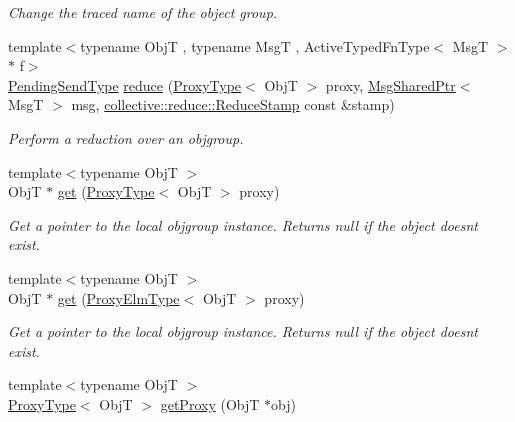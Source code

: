 \begin{DoxyCompactItemize}
\begin{DoxyCompactList}\small\item\em Change the traced name of the object group. \end{DoxyCompactList}\item 
{\footnotesize template$<$typename ObjT , typename MsgT , Active\+Typed\+Fn\+Type$<$ Msg\+T $>$ $\ast$ f$>$ }\\\hyperlink{structvt_1_1objgroup_1_1_obj_group_manager_a4f82f640edf670ba5a282074e5710921}{Pending\+Send\+Type} \hyperlink{structvt_1_1objgroup_1_1_obj_group_manager_a2aac72728c665b10dc7df994b3e326bc}{reduce} (\hyperlink{structvt_1_1objgroup_1_1_obj_group_manager_aea65eef52f240a52210132eef5ce591f}{Proxy\+Type}$<$ ObjT $>$ proxy, \hyperlink{namespacevt_ab2b3d506ec8e8d1540aede826d84a239}{Msg\+Shared\+Ptr}$<$ MsgT $>$ msg, \hyperlink{namespacevt_1_1collective_1_1reduce_a7b7cb3021ac5654d92825d9fab0250b2}{collective\+::reduce\+::\+Reduce\+Stamp} const \&stamp)
\begin{DoxyCompactList}\small\item\em Perform a reduction over an objgroup. \end{DoxyCompactList}\item 
{\footnotesize template$<$typename ObjT $>$ }\\ObjT $\ast$ \hyperlink{structvt_1_1objgroup_1_1_obj_group_manager_a4b11402fc31ca40e1dd2eacb65101e2b}{get} (\hyperlink{structvt_1_1objgroup_1_1_obj_group_manager_aea65eef52f240a52210132eef5ce591f}{Proxy\+Type}$<$ ObjT $>$ proxy)
\begin{DoxyCompactList}\small\item\em Get a pointer to the local objgroup instance. Returns null if the object doesn\textquotesingle{}t exist. \end{DoxyCompactList}\item 
{\footnotesize template$<$typename ObjT $>$ }\\ObjT $\ast$ \hyperlink{structvt_1_1objgroup_1_1_obj_group_manager_a70e5e1d0ada31d6f88a8ec88965df895}{get} (\hyperlink{structvt_1_1objgroup_1_1_obj_group_manager_adba6c8ecb0f4c30e719f1abb995cfc9b}{Proxy\+Elm\+Type}$<$ ObjT $>$ proxy)
\begin{DoxyCompactList}\small\item\em Get a pointer to the local objgroup instance. Returns null if the object doesn\textquotesingle{}t exist. \end{DoxyCompactList}\item 
{\footnotesize template$<$typename ObjT $>$ }\\\hyperlink{structvt_1_1objgroup_1_1_obj_group_manager_aea65eef52f240a52210132eef5ce591f}{Proxy\+Type}$<$ ObjT $>$ \hyperlink{structvt_1_1objgroup_1_1_obj_group_manager_a9758d68a4656e7ff2eb1ac07b4feeeed}{get\+Proxy} (ObjT $\ast$obj)

\end{DoxyCompactItemize}
